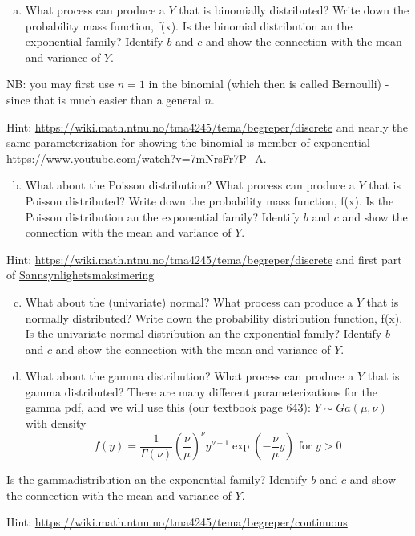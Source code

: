 \documentclass[
  ignorenonframetext,
]{beamer}
\providecommand{\tightlist}{%
  \setlength{\itemsep}{0pt}\setlength{\parskip}{0pt}}
\begin{document}
\begin{frame}
\begin{enumerate}
[a)]
\tightlist
\item
  What process can produce a \(Y\) that is binomially distributed? Write
  down the probability mass function, f(x). Is the binomial distribution
  an the exponential family? Identify \(b\) and \(c\) and show the
  connection with the mean and variance of \(Y\).
\end{enumerate}

NB: you may first use \(n=1\) in the binomial (which then is called
Bernoulli) - since that is much easier than a general \(n\).

Hint: \url{https://wiki.math.ntnu.no/tma4245/tema/begreper/discrete} and
nearly the same parameterization for showing the binomial is member of
exponential \url{https://www.youtube.com/watch?v=7mNrsFr7P_A}.

\begin{enumerate}
[a)]
\setcounter{enumi}{1}
\tightlist
\item
  What about the Poisson distribution? What process can produce a \(Y\)
  that is Poisson distributed? Write down the probability mass function,
  f(x). Is the Poisson distribution an the exponential family? Identify
  \(b\) and \(c\) and show the connection with the mean and variance of
  \(Y\).
\end{enumerate}

Hint: \url{https://wiki.math.ntnu.no/tma4245/tema/begreper/discrete} and
first part of
\href{https://mediasite.ntnu.no/Mediasite/Play/db9c6fbc45bf48abb8a4dd00ff146e081d?catalog=0fce6173-7a98-4db7-84b7-50cba3a3a341}{Sannsynlighetsmaksimering}
\end{frame}

\begin{frame}
\begin{enumerate}
[a)]
\setcounter{enumi}{2}
\item
  What about the (univariate) normal? What process can produce a \(Y\)
  that is normally distributed? Write down the probability distribution
  function, f(x). Is the univariate normal distribution an the
  exponential family? Identify \(b\) and \(c\) and show the connection
  with the mean and variance of \(Y\).
\item
  What about the gamma distribution? What process can produce a \(Y\)
  that is gamma distributed? There are many different parameterizations
  for the gamma pdf, and we will use this (our textbook page 643):
  \(Y \sim Ga(\mu,\nu)\) with density
  \[ f(y)=\frac{1}{\Gamma(\nu)} (\frac{\nu}{\mu})^{\nu} y^{\nu-1}\exp(-\frac{\nu}{\mu}y) \text{ for }y>0\]
\end{enumerate}

Is the gammadistribution an the exponential family? Identify \(b\) and
\(c\) and show the connection with the mean and variance of \(Y\).

Hint: \url{https://wiki.math.ntnu.no/tma4245/tema/begreper/continuous}
\end{frame}
\end{document}

